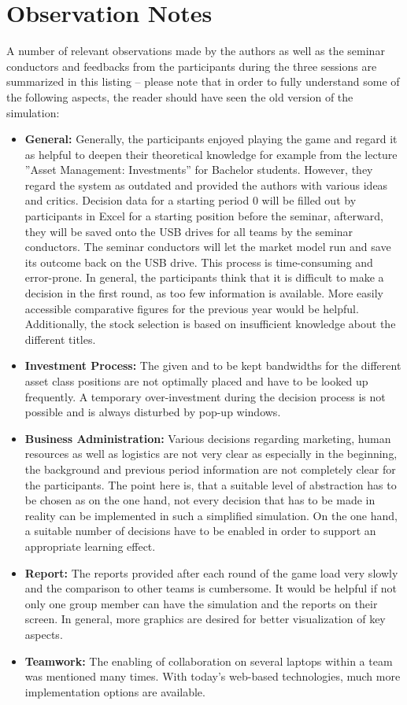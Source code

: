 \section{Observation Notes}
\label{sec:appendix_observation_notes}

A number of relevant observations made by the authors as well as the seminar conductors and feedbacks from the participants during the three sessions are summarized in this listing – please note that in order to fully understand some of the following aspects, the reader should have seen the old version of the simulation:

\begin{itemize}
  \item \textbf{General:} Generally, the participants enjoyed playing the game and regard it as helpful to deepen their theoretical knowledge for example from the lecture ''Asset Management: Investments'' for Bachelor students. However, they regard the system as outdated and provided the authors with various ideas and critics. Decision data for a starting period 0 will be filled out by participants in Excel for a starting position before the seminar, afterward, they will be saved onto the USB drives for all teams by the seminar conductors. The seminar conductors will let the market model run and save its outcome back on the USB drive. This process is time-consuming and error-prone. In general, the participants think that it is difficult to make a decision in the first round, as too few information is available. More easily accessible comparative figures for the previous year would be helpful. Additionally, the stock selection is based on insufficient knowledge about the different titles.
  \item \textbf{Investment Process:} The given and to be kept bandwidths for the different asset class positions are not optimally placed and have to be looked up frequently. A temporary over-investment during the decision process is not possible and is always disturbed by pop-up windows.
  \item \textbf{Business Administration:} Various decisions regarding marketing, human resources as well as logistics are not very clear as especially in the beginning, the background and previous period information are not completely clear for the participants. The point here is, that a suitable level of abstraction has to be chosen as on the one hand, not every decision that has to be made in reality can be implemented in such a simplified simulation. On the one hand, a suitable number of decisions have to be enabled in order to support an appropriate learning effect.
  \item \textbf{Report:} The reports provided after each round of the game load very slowly and the comparison to other teams is cumbersome. It would be helpful if not only one group member can have the simulation and the reports on their screen. In general, more graphics are desired for better visualization of key aspects.
  \item \textbf{Teamwork:} The enabling of collaboration on several laptops within a team was mentioned many times. With today’s web-based technologies, much more implementation options are available.
\end{itemize}

